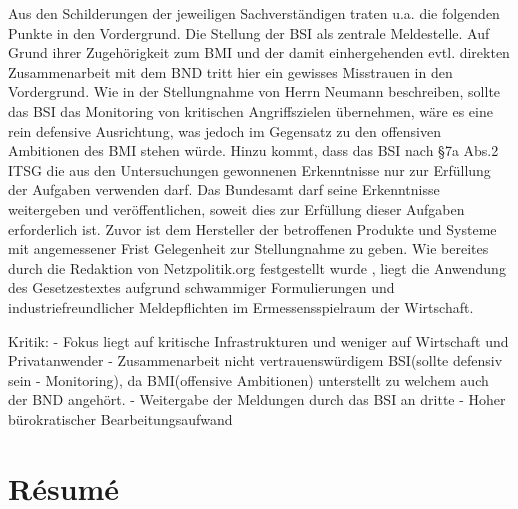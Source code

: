 \documentclass[a4paper,letterpaper,twocolumn,10pt,ngerman]{article}
\begin{document}
Aus den Schilderungen der jeweiligen Sachverständigen traten u.a. die folgenden Punkte in den Vordergrund. Die Stellung der BSI als zentrale Meldestelle. Auf Grund ihrer Zugehörigkeit zum BMI und der damit einhergehenden evtl. direkten Zusammenarbeit mit dem BND tritt hier ein gewisses Misstrauen in den Vordergrund. Wie in der Stellungnahme von Herrn Neumann \cite[vlg.][S. 4]{NeuCCC15}  beschreiben, sollte das BSI das Monitoring von kritischen Angriffszielen übernehmen, wäre es eine rein defensive Ausrichtung, was jedoch im Gegensatz zu den offensiven Ambitionen des BMI stehen würde. Hinzu kommt, dass das BSI nach §7a Abs.2 ITSG die aus den Untersuchungen gewonnenen Erkenntnisse nur zur Erfüllung der Aufgaben verwenden darf. Das Bundesamt darf seine Erkenntnisse weitergeben und veröffentlichen, soweit dies zur Erfüllung dieser Aufgaben erforderlich ist. Zuvor ist dem Hersteller der betroffenen Produkte und Systeme mit angemessener Frist Gelegenheit zur Stellungnahme zu geben. Wie bereites durch die Redaktion von Netzpolitik.org festgestellt wurde \cite{Bis15}, liegt die Anwendung des Gesetzestextes aufgrund schwammiger Formulierungen und industriefreundlicher Meldepflichten im Ermessensspielraum der Wirtschaft. 

Kritik:
- Fokus liegt auf kritische Infrastrukturen und weniger auf Wirtschaft und Privatanwender
- Zusammenarbeit nicht vertrauenswürdigem BSI(sollte defensiv sein - Monitoring), da BMI(offensive Ambitionen) unterstellt zu welchem auch der BND angehört.
- Weitergabe der Meldungen durch das BSI an dritte
- Hoher bürokratischer Bearbeitungsaufwand

\section{Résumé}


%
%
\printbibliography
\end{document}

